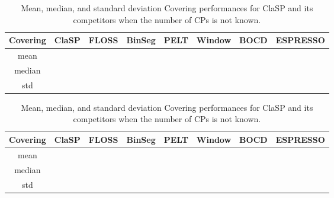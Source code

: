 \documentclass[pdflatex,sn-basic]{sn-jnl}
\begin{document}
\begin{table}[t]
	\caption{Mean, median, and standard deviation Covering performances for ClaSP and its competitors when the number of CPs is not known.\label{tab:unsupervised_summary}}

	\begin{minipage}{12cm}
    	\begin{centering}
    		\begin{tabular}{c|ccccccc}
    			\toprule 			
    			Covering & ClaSP & FLOSS & BinSeg & PELT & Window & BOCD & ESPRESSO\tabularnewline
    			\hline 
    			 mean &  &  &  &  &  &  &  \tabularnewline
    			 median &  &  &  &  &  &  &  \tabularnewline
    			 std &  &  &  &  &  &  &  \tabularnewline
    			\bottomrule 			
    		\end{tabular}
    	\par\end{centering}
	\end{minipage}

	\begin{minipage}{12cm}
    	\begin{centering}
    		\begin{tabular}{c|ccccccc}
    			\toprule 			
    			Covering & ClaSP & FLOSS & BinSeg & PELT & Window & BOCD & ESPRESSO\tabularnewline
    			\hline 
    			 mean &  &  &  &  &  &  &  \tabularnewline
    			 median &  &  &  &  &  &  &  \tabularnewline
    			 std &  &  &  &  &  &  &  \tabularnewline
    			\bottomrule 			
    		\end{tabular}
	    \par\end{centering}
	\end{minipage}
	
\end{table}
\end{document}
